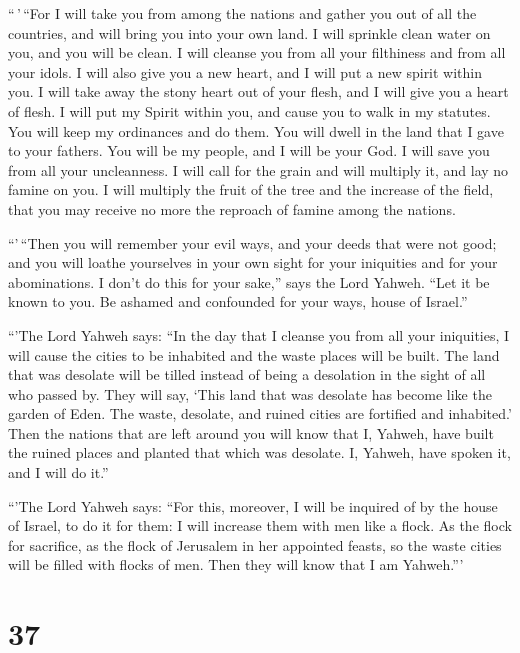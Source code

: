  ``\,'\,``For I will take you from among the nations and
gather you out of all the countries, and will bring you into your own
land.  I will sprinkle clean water on you, and you will
be clean. I will cleanse you from all your filthiness and from all your
idols.  I will also give you a new heart, and I will put
a new spirit within you. I will take away the stony heart out of your
flesh, and I will give you a heart of flesh.  I will put
my Spirit within you, and cause you to walk in my statutes. You will
keep my ordinances and do them.  You will dwell in the
land that I gave to your fathers. You will be my people, and I will be
your God.  I will save you from all your uncleanness. I
will call for the grain and will multiply it, and lay no famine on you.
 I will multiply the fruit of the tree and the increase
of the field, that you may receive no more the reproach of famine among
the nations.

 ``'\,``Then you will remember your evil ways, and your
deeds that were not good; and you will loathe yourselves in your own
sight for your iniquities and for your abominations.  I
don't do this for your sake,'' says the Lord Yahweh. ``Let it be known
to you. Be ashamed and confounded for your ways, house of Israel.''

 ``'The Lord Yahweh says: ``In the day that I cleanse you
from all your iniquities, I will cause the cities to be inhabited and
the waste places will be built.  The land that was
desolate will be tilled instead of being a desolation in the sight of
all who passed by.  They will say, `This land that was
desolate has become like the garden of Eden. The waste, desolate, and
ruined cities are fortified and inhabited.'  Then the
nations that are left around you will know that I, Yahweh, have built
the ruined places and planted that which was desolate. I, Yahweh, have
spoken it, and I will do it.''

 ``'The Lord Yahweh says: ``For this, moreover, I will be
inquired of by the house of Israel, to do it for them: I will increase
them with men like a flock.  As the flock for sacrifice,
as the flock of Jerusalem in her appointed feasts, so the waste cities
will be filled with flocks of men. Then they will know that I am
Yahweh.'''

\hypertarget{section-35}{%
\section{37}\label{section-35}}

